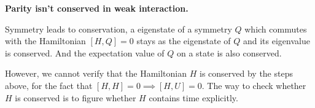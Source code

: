 
\textbf{Parity isn't conserved in weak interaction.}

Symmetry leads to conservation, a eigenstate of a symmetry $Q$ which commutes with the Hamiltonian $[H, Q] = 0$ stays as the eigenstate of $Q$ and its eigenvalue is conserved.
And the expectation value of $Q$ on a state is also conserved. 


However, we cannot verify that the Hamiltonian $H$ is conserved by the steps above, for the fact that $[H,H] = 0 \implies [H, U] = 0$. The way to check whether $H$ is conserved is to figure whether $H$ contains time explicitly.


